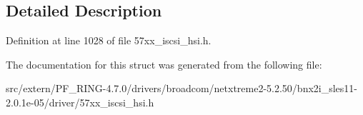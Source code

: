 \subsection{Detailed Description}


Definition at line 1028 of file 57xx\_\-iscsi\_\-hsi.h.



The documentation for this struct was generated from the following file:\begin{DoxyCompactItemize}
\item 
src/extern/PF\_\-RING-\/4.7.0/drivers/broadcom/netxtreme2-\/5.2.50/bnx2i\_\-sles11-\/2.0.1e-\/05/driver/57xx\_\-iscsi\_\-hsi.h\end{DoxyCompactItemize}
